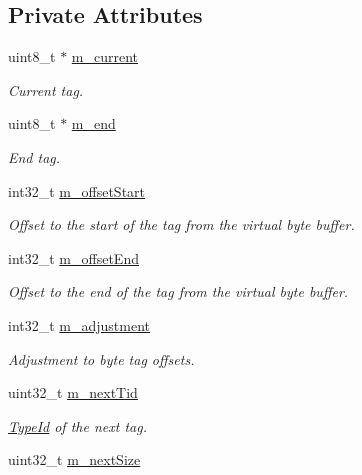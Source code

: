 \subsection*{Private Attributes}
\begin{DoxyCompactItemize}
\item 
uint8\+\_\+t $\ast$ \hyperlink{classns3_1_1ByteTagList_1_1Iterator_a12d17a309f11f53143033cb31a351fa6}{m\+\_\+current}
\begin{DoxyCompactList}\small\item\em Current tag. \end{DoxyCompactList}\item 
uint8\+\_\+t $\ast$ \hyperlink{classns3_1_1ByteTagList_1_1Iterator_afda983adc3e638e0bc6d1b3eb2e1087e}{m\+\_\+end}
\begin{DoxyCompactList}\small\item\em End tag. \end{DoxyCompactList}\item 
int32\+\_\+t \hyperlink{classns3_1_1ByteTagList_1_1Iterator_a9cee01030bde8d16fa4916ab99d6b47d}{m\+\_\+offset\+Start}
\begin{DoxyCompactList}\small\item\em Offset to the start of the tag from the virtual byte buffer. \end{DoxyCompactList}\item 
int32\+\_\+t \hyperlink{classns3_1_1ByteTagList_1_1Iterator_a1c1d1db54dc1eae50373416f74bfd814}{m\+\_\+offset\+End}
\begin{DoxyCompactList}\small\item\em Offset to the end of the tag from the virtual byte buffer. \end{DoxyCompactList}\item 
int32\+\_\+t \hyperlink{classns3_1_1ByteTagList_1_1Iterator_a1a2f740d59491d621690a0480c76a056}{m\+\_\+adjustment}
\begin{DoxyCompactList}\small\item\em Adjustment to byte tag offsets. \end{DoxyCompactList}\item 
uint32\+\_\+t \hyperlink{classns3_1_1ByteTagList_1_1Iterator_af0da490a20b9003e24e8aae05a49e6cc}{m\+\_\+next\+Tid}
\begin{DoxyCompactList}\small\item\em \hyperlink{classns3_1_1TypeId}{Type\+Id} of the next tag. \end{DoxyCompactList}\item 
uint32\+\_\+t \hyperlink{classns3_1_1ByteTagList_1_1Iterator_aa23792f1290917fa1e420b2bd5462dc9}{m\+\_\+next\+Size}

\end{DoxyCompactItemize}

